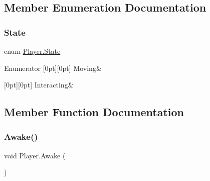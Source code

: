 \subsection{Member Enumeration Documentation}
\mbox{\label{class_player_aa3b6104791d642173caf761cf81f8c08}} 
\subsubsection{\texorpdfstring{State}{State}}
{\footnotesize\ttfamily enum \mbox{\hyperlink{class_player_aa3b6104791d642173caf761cf81f8c08}{Player.\+State}}\hspace{0.3cm}{\ttfamily [strong]}}

\begin{DoxyEnumFields}{Enumerator}
[0pt][0pt]{}\mbox{\label{class_player_aa3b6104791d642173caf761cf81f8c08adefe967ad0373b2274fc298f19125ca7}} 
Moving&\\
\hline

[0pt][0pt]{}\mbox{\label{class_player_aa3b6104791d642173caf761cf81f8c08af023446a52e84d38f186937dad1d8f76}} 
Interacting&\\
\hline

\end{DoxyEnumFields}


\subsection{Member Function Documentation}
\mbox{\label{class_player_aaddfa9f3b558df64f5d1d09e2b906901}} 
\subsubsection{\texorpdfstring{Awake()}{Awake()}}
{\footnotesize\ttfamily void Player.\+Awake (\begin{DoxyParamCaption}{ }\end{DoxyParamCaption})\hspace{0.3cm}{\ttfamily [private]}}

